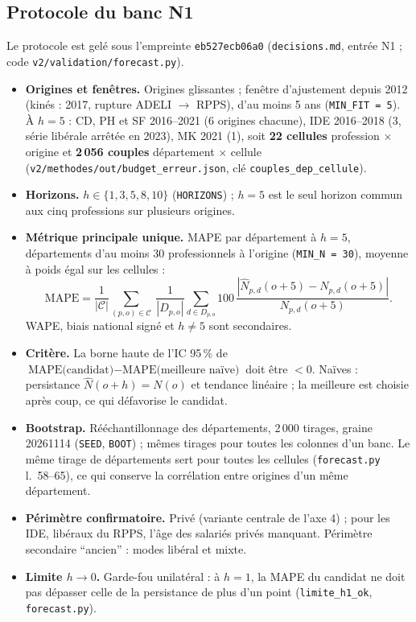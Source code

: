 \subsection{Protocole du banc N1}
\label{met:protocole}
Le protocole est gelé sous l'empreinte \texttt{eb527ecb06a0} (\texttt{decisions.md}, entrée N1 ; code
\texttt{v2/validation/forecast.py}).
\begin{itemize}
  \item \textbf{Origines et fenêtres.} Origines glissantes ; fenêtre d'ajustement depuis 2012 (kinés : 2017,
    rupture ADELI $\to$ RPPS), d'au moins 5 ans (\texttt{MIN\_FIT = 5}). À $h = 5$ : CD, PH et SF 2016--2021
    (6 origines chacune), IDE 2016--2018 (3, série libérale arrêtée en 2023), MK 2021 (1), soit
    \textbf{22 cellules} profession $\times$ origine\mesure{} et \textbf{2\,056 couples} département
    $\times$ cellule\mesure{} (\texttt{v2/methodes/out/budget\_erreur.json}, clé
    \texttt{couples\_dep\_cellule}).
  \item \textbf{Horizons.} $h \in \{1, 3, 5, 8, 10\}$ (\texttt{HORIZONS}) ; $h = 5$ est le seul horizon
    commun aux cinq professions sur plusieurs origines.
  \item \textbf{Métrique principale unique.} MAPE par département à $h = 5$, départements d'au moins 30
    professionnels à l'origine (\texttt{MIN\_N = 30}), moyenne à poids égal sur les cellules :
    \begin{equation}
      \text{MAPE} = \frac{1}{|\mathcal C|}\sum_{(p,o)\in\mathcal C}\ \frac{1}{|D_{p,o}|}\sum_{d \in D_{p,o}}
      100\,\frac{|\hat N_{p,d}(o+5) - N_{p,d}(o+5)|}{N_{p,d}(o+5)} .
    \end{equation}
    WAPE, biais national signé et $h \ne 5$ sont secondaires.
  \item \textbf{Critère.} La borne haute de l'IC 95\,\% de $\text{MAPE(candidat)} - \text{MAPE(meilleure
    naïve)}$ doit être $< 0$. Naïves : persistance $\hat N(o+h) = N(o)$ et tendance linéaire ; la meilleure est
    choisie après coup, ce qui défavorise le candidat.
  \item \textbf{Bootstrap.} Rééchantillonnage des départements, 2\,000 tirages, graine 20261114
    (\texttt{SEED}, \texttt{BOOT}) ; mêmes tirages pour toutes les colonnes d'un banc. Le même tirage de
    départements sert pour toutes les cellules (\texttt{forecast.py} l.~58--65), ce qui conserve la
    corrélation entre origines d'un même département.
  \item \textbf{Périmètre confirmatoire.} Privé (variante centrale de l'axe 4) ; pour les IDE, libéraux du
    RPPS, l'âge des salariés privés manquant. Périmètre secondaire \enquote{ancien} : modes libéral et mixte.
  \item \textbf{Limite $h \to 0$.} Garde-fou unilatéral : à $h = 1$, la MAPE du candidat ne doit pas
    dépasser celle de la persistance de plus d'un point (\texttt{limite\_h1\_ok}, \texttt{forecast.py}).
\end{itemize}
